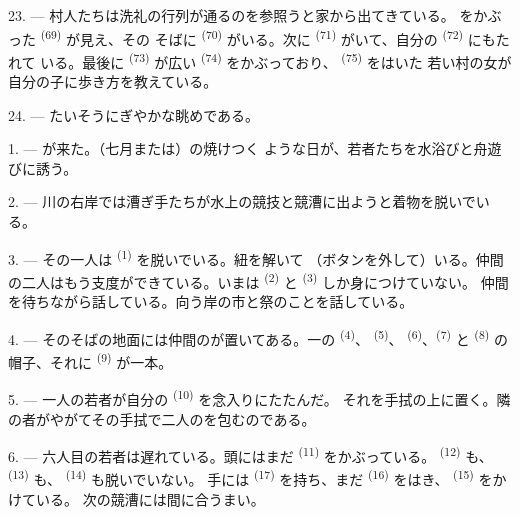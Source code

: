 23. --- 村人たちは洗礼の行列が通るのを参照うと家から出てきている。
をかぶった \textsuperscript{(69)} が見え、その
そばに \textsuperscript{(70)} がいる。次に
\textsuperscript{(71)} がいて、自分の \textsuperscript{(72)} にもたれて
いる。最後に \textsuperscript{(73)} が広い
\textsuperscript{(74)} をかぶっており、 \textsuperscript{(75)} をはいた
若い村の女が自分の子に歩き方を教えている。

24. --- たいそうにぎやかな眺めである。
\VUsaut{4.0mm}

\VUsaut{3.0mm}

\VUsaut{2.4mm}

\VUsaut{3.0mm}

1. --- が来た。（七月または）の焼けつく
ような日が、若者たちを水浴びと舟遊びに誘う。

2. --- 川の右岸では漕ぎ手たちが水上の競技と競漕に出ようと着物を脱いでいる。

3. --- その一人は \textsuperscript{(1)} を脱いでいる。紐を解いて
（ボタンを外して）いる。仲間の二人はもう支度ができている。いまは
\textsuperscript{(2)} と \textsuperscript{(3)} しか身につけていない。
仲間を待ちながら話している。向う岸の市と祭のことを話している。

4. --- そのそばの地面には仲間のが置いてある。一の
 \textsuperscript{(4)}、 \textsuperscript{(5)}、
 \textsuperscript{(6)}、\textsuperscript{(7)} と
 \textsuperscript{(8)} の帽子、それに
\textsuperscript{(9)} が一本。

5. --- 一人の若者が自分の \textsuperscript{(10)} を念入りにたたんだ。
それを手拭の上に置く。隣の者がやがてその手拭で二人のを包むのである。

6. --- 六人目の若者は遅れている。頭にはまだ \textsuperscript{(11)}
をかぶっている。 \textsuperscript{(12)} も、
\textsuperscript{(13)} も、 \textsuperscript{(14)} も脱いでいない。
手には \textsuperscript{(17)} を持ち、まだ
\textsuperscript{(16)} をはき、 \textsuperscript{(15)} をかけている。
次の競漕には間に合うまい。

